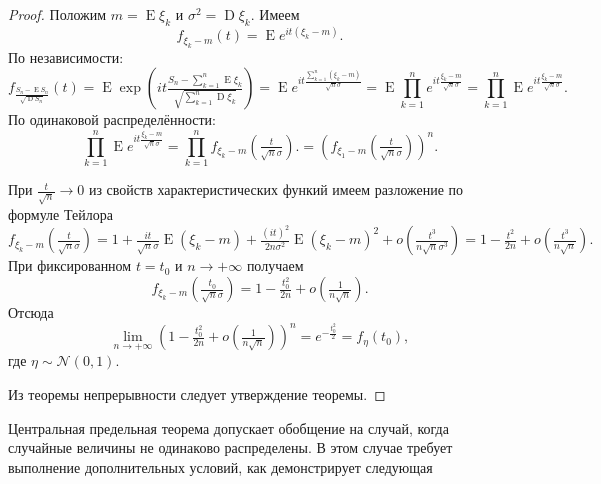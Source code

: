 \documentclass[12pt]{article}
\numberwithin{theorem}{section}
\theoremstyle{definition}
\newcommand{\expect}{\operatorname{E}}
\newcommand{\disp}{\operatorname{D}}
\begin{document}
	\begin{proof}
		Положим $ m = \expect\xi_k $ и $ \sigma^2 = \disp\xi_k $.
		Имеем
		$$ f_{\xi_k - m}(t) = \expect e^{it(\xi_k - m)}. $$ 
		По независимости: 
		$$ f_{\tfrac{S_n - \expect S_n}{\sqrt{\disp S_n}}}(t)
		= \expect \exp\left(it{\tfrac{S_n - \sum\limits_{k = 1}^{n} \expect\xi_k}{\sqrt{\sum\limits_{k = 1}^{n} \disp\xi_k}}}\right)
		= \expect e^{it\tfrac{\sum\limits_{k = 1}^{n} (\xi_k - m) }{\sqrt{n}\sigma}}
		= \expect \prod\limits_{k = 1}^{n} e^{it\tfrac{\xi_k - m}{\sqrt{n}\sigma}}
		= \prod\limits_{k = 1}^{n} \expect e^{it\tfrac{\xi_k - m}{\sqrt{n}\sigma}}. $$
		По одинаковой распределённости:
		$$ \prod\limits_{k = 1}^{n} \expect e^{it\tfrac{\xi_k - m}{\sqrt{n}\sigma}} 
		= \prod\limits_{k = 1}^{n} f_{\xi_k - m}(\tfrac{t}{\sqrt{n}\sigma}).
		= \left(f_{\xi_1 - m}(\tfrac{t}{\sqrt{n}\sigma})\right)^n. $$
		
		При $ \tfrac{t}{\sqrt{n}} \to 0 $ из свойств характеристических функий имеем разложение по формуле Тейлора
		$$ f_{\xi_k - m}(\tfrac{t}{\sqrt{n}\sigma}) = 1 + \tfrac{it}{\sqrt{n}\sigma}\expect(\xi_k - m)
		+ \tfrac{(it)^2}{2n\sigma^2}\expect(\xi_k - m)^2 + o(\tfrac{t^3}{n\sqrt{n}\sigma^3})
		= 1 - \tfrac{t^2}{2n} + o(\tfrac{t^3}{n\sqrt{n}}). $$
		При фиксированном $ t = t_0 $ и $ n \to +\infty $ получаем
		$$ f_{\xi_k - m}(\tfrac{t_0}{\sqrt{n}\sigma}) = 1 - \tfrac{t_0^2}{2n} + o(\tfrac{1}{n\sqrt{n}}). $$
		Отсюда
		$$ \lim\limits_{n \to +\infty} \left(1 - \tfrac{t_0^2}{2n} + o(\tfrac{1}{n\sqrt{n}})\right)^n
		= e^{-\tfrac{t_0^2}{2}} = f_{\eta}(t_0), $$
		где $ \eta \sim \mathcal{N}(0, 1) $.
		
		Из теоремы непрерывности следует утверждение теоремы.
	\end{proof}
	
	Центральная предельная теорема допускает обобщение на случай, 
	когда случайные величины не одинаково распределены.
	В этом случае требует выполнение дополнительных условий,
	как демонстрирует следующая
	
\end{document}
